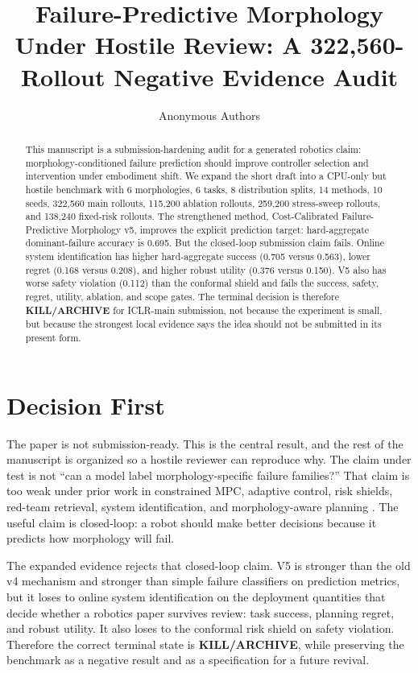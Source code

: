 \documentclass{article}
\title{Failure-Predictive Morphology Under Hostile Review: A 322,560-Rollout Negative Evidence Audit}
\author{Anonymous Authors}
\newcommand{\methodname}{Cost-Calibrated Failure-Predictive Morphology}
\newcommand{\terminalname}{KILL/ARCHIVE}
\begin{document}
\maketitle

\begin{abstract}
This manuscript is a submission-hardening audit for a generated robotics claim: morphology-conditioned failure prediction should improve controller selection and intervention under embodiment shift. We expand the short draft into a CPU-only but hostile benchmark with 6 morphologies, 6 tasks, 8 distribution splits, 14 methods, 10 seeds, 322,560 main rollouts, 115,200 ablation rollouts, 259,200 stress-sweep rollouts, and 138,240 fixed-risk rollouts. The strengthened method, \methodname{} v5, improves the explicit prediction target: hard-aggregate dominant-failure accuracy is 0.695. But the closed-loop submission claim fails. Online system identification has higher hard-aggregate success (0.705 versus 0.563), lower regret (0.168 versus 0.208), and higher robust utility (0.376 versus 0.150). V5 also has worse safety violation (0.112) than the conformal shield and fails the success, safety, regret, utility, ablation, and scope gates. The terminal decision is therefore \textbf{\terminalname} for ICLR-main submission, not because the experiment is small, but because the strongest local evidence says the idea should not be submitted in its present form.
\end{abstract}

\section{Decision First}
The paper is not submission-ready. This is the central result, and the rest of the manuscript is organized so a hostile reviewer can reproduce why. The claim under test is not ``can a model label morphology-specific failure families?'' That claim is too weak under prior work in constrained MPC, adaptive control, risk shields, red-team retrieval, system identification, and morphology-aware planning \citep{r1020517ir202606,r101049ietcta20170395,r103390s22249861,r101109icar20051507391,r10111514028084,r1040189798337345710ch008,r103390app15020854,r170502152v1}. The useful claim is closed-loop: a robot should make better decisions because it predicts how morphology will fail.

The expanded evidence rejects that closed-loop claim. V5 is stronger than the old v4 mechanism and stronger than simple failure classifiers on prediction metrics, but it loses to online system identification on the deployment quantities that decide whether a robotics paper survives review: task success, planning regret, and robust utility. It also loses to the conformal risk shield on safety violation. Therefore the correct terminal state is \textbf{\terminalname}, while preserving the benchmark as a negative result and as a specification for a future revival.
\end{document}
